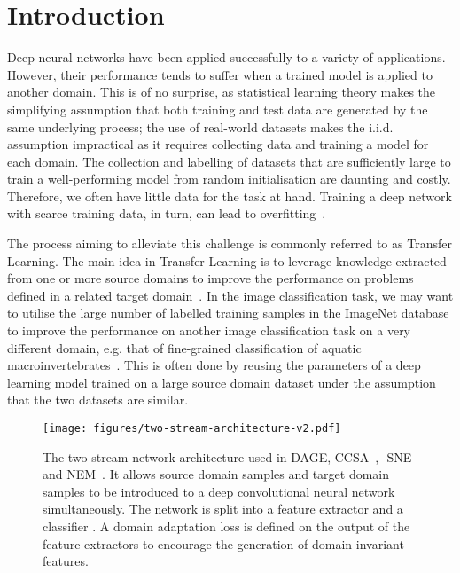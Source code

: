 \documentclass[journal]{IEEEtran}
\begin{document}
\maketitle


\section{Introduction} \label{sec:introduction}

Deep neural networks have been applied successfully to a variety of applications. However, their performance tends to suffer when a trained model is applied to another domain. This is of no surprise, as statistical learning theory makes the simplifying assumption that both training and test data are generated by the same underlying process; the use of real-world datasets makes the i.i.d. assumption impractical as it requires collecting data and training a model for each domain. The collection and labelling of datasets that are sufficiently large to train a well-performing model from random initialisation are daunting and costly. Therefore, we often have little data for the task at hand. Training a deep network with scarce training data, in turn, can lead to overfitting~\cite{arpit2017closer}. 

The process aiming to alleviate this challenge is commonly referred to as Transfer Learning. The main idea in Transfer Learning is to leverage knowledge extracted from one or more source domains to improve the performance on problems defined in a related target domain~\cite{pan2010survey, weiss2016survey, torrey2010transfer}. In the image classification task, we may want to utilise the large number of labelled training samples in the ImageNet database to improve the performance on another image classification task on a very different domain, e.g. that of fine-grained classification of aquatic macroinvertebrates~\cite{raitoharju2016data}. This is often done by reusing the parameters of a deep learning model trained on a large source domain dataset under the assumption that the two datasets are similar. 

\begin{figure}[!t]
    \centering
    \texttt{[image: figures/two-stream-architecture-v2.pdf]}
    \caption{The two-stream network architecture used in DAGE, CCSA~\cite{motiian2017ccsa}, -SNE~\cite{xu2019dsne} and NEM~\cite{wang2019nem}. It allows source domain samples  and target domain samples  to be introduced to a deep convolutional neural network simultaneously. The network is split into a feature extractor  and a classifier . A domain adaptation loss  is defined on the output of the feature extractors to encourage the generation of domain-invariant features.}
    \label{fig:two-stream-architecture}
\end{figure}
\end{document}

